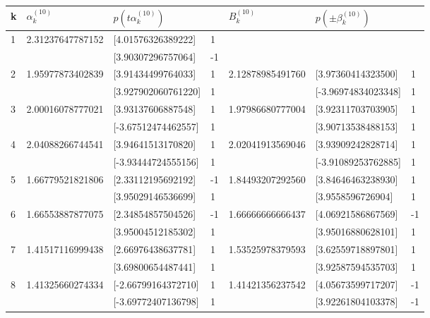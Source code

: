 \documentclass[10pt]{article}
\begin{document}
\begin{table}[h]
\begin{center}
\begin{tabular}{|l|l|l|l|l|l|l|}
\hline
k & $\alpha_{k}^{(10)}$ & $p\left(t \alpha_{k}^{(10)}\right)$ &  & $B_{k}^{(10)}$ & $p\left( \pm \beta_{k}^{(10)}\right)$ &  \\
\hline
\multirow[t]{2}{*}{1} & \multirow[t]{2}{*}{2.31237647787152} & [4.01576326389222] & 1 &  &  &  \\
\hline
 &  & [3.90307296757064] & -1 &  &  &  \\
\hline
\multirow[t]{2}{*}{2} & \multirow[t]{2}{*}{1.95977873402839} & [3.91434499764033] & 1 & 2.12878985491760 & [3.97360414323500] & 1 \\
\hline
 &  & [3.927902060761220] & 1 &  & [-3.96974834023348] & 1 \\
\hline
\multirow[t]{2}{*}{3} & \multirow[t]{2}{*}{2.00016078777021} & [3.93137606887548] & 1 & 1.97986680777004 & [3.92311703703905] & 1 \\
\hline
 &  & [-3.67512474462557] & 1 &  & [3.90713538488153] & 1 \\
\hline
\multirow[t]{2}{*}{4} & \multirow[t]{2}{*}{2.04088266744541} & [3.94641513170820] & 1 & 2.02041913569046 & [3.93909242828714] & 1 \\
\hline
 &  & [-3.93444724555156] & 1 &  & [-3.91089253762885] & 1 \\
\hline
\multirow[t]{2}{*}{5} & \multirow[t]{2}{*}{1.66779521821806} & [2.33112195692192] & -1 & 1.84493207292560 & [3.84646463238930] & 1 \\
\hline
 &  & [3.95029146536699] & 1 &  & [3.9558596726904] & 1 \\
\hline
\multirow[t]{2}{*}{6} & \multirow[t]{2}{*}{1.66553887877075} & [2.34854857504526] & -1 & 1.66666666666437 & [4.06921586867569] & -1 \\
\hline
 &  & [3.95004512185302] & 1 &  & [3.95016880628101] & 1 \\
\hline
\multirow[t]{2}{*}{7} & \multirow[t]{2}{*}{1.41517116999438} & [2.66976438637781] & 1 & 1.53525978379593 & [3.62559718897801] & 1 \\
\hline
 &  & [3.69800654487441] & 1 &  & [3.92587594535703] & 1 \\
\hline
\multirow[t]{2}{*}{8} & \multirow[t]{2}{*}{1.41325660274334} & [-2.66799164372710] & 1 & 1.41421356237542 & [4.05673599717207] & -1 \\
\hline
 &  & [-3.69772407136798] & 1 &  & [3.92261804103378] & -1 \\

\end{tabular}
\end{center}
\end{table}
\end{document}
